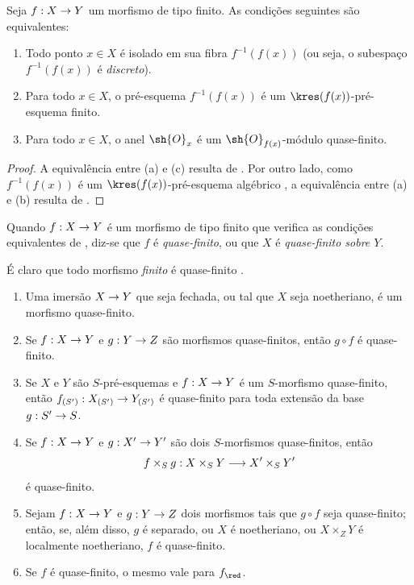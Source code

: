 \documentclass[oneside,10pt]{amsart}
\makeatletter
\newcommand{\ega@arrow}[2]{\mathchoice{#1}{#2}{#2}{#2}}
\renewcommand{\to}{\ega@arrow{\longrightarrow}{\rightarrow}}
\let\EGAOriginalLabel\label
\renewcommand{\label}[1]{\phantomsection\EGAOriginalLabel{#1}}
\makeatother
\begin{document}
\begin{corollary}[6.2.2]
\label{II.6.2.2}
Seja $f:X\to Y$ um morfismo de tipo finito.
As condições seguintes são equivalentes:
\begin{enumerate}
  \item[\rm{(a)}] Todo ponto $x\in X$ é isolado em sua fibra $f^{-1}(f(x))$ (ou seja, o subespaço $f^{-1}(f(x))$ é \emph{discreto}).
  \item[\rm{(b)}] Para todo $x\in X$, o pré-esquema $f^{-1}(f(x))$ é um $\kres(f(x))$-pré-esquema finito.
  \item[\rm{(c)}] Para todo $x\in X$, o anel $\sh{O}_x$ é um $\sh{O}_{f(x)}$-módulo quase-finito.
\end{enumerate}
\end{corollary}

\begin{proof}
A equivalência entre (a) e (c) resulta de .
Por outro lado, como $f^{-1}(f(x))$ é um $\kres(f(x))$-pré-esquema algébrico , a equivalência entre (a) e (b) resulta de .
\end{proof}

\begin{definition}[6.2.3]
\label{II.6.2.3}
Quando $f:X\to Y$ é um morfismo de tipo finito que verifica as condições equivalentes de , diz-se que $f$ é \emph{quase-finito}, ou que $X$ é \emph{quase-finito sobre $Y$}.
\end{definition}

É claro que todo morfismo \emph{finito} é quase-finito .

\begin{proposition}[6.2.4]
\label{II.6.2.4}
\medskip\noindent
\begin{enumerate}
  \item[\rm{(i)}] Uma imersão $X\to Y$ que seja fechada, ou tal que $X$ seja noetheriano, é um morfismo quase-finito.
  \item[\rm{(ii)}] Se $f:X\to Y$ e $g:Y\to Z$ são morfismos quase-finitos, então $g\circ f$ é quase-finito.
  \item[\rm{(iii)}] Se $X$ e $Y$ são $S$-pré-esquemas e $f:X\to Y$ é um $S$-morfismo quase-finito, então $f_{(S')}:X_{(S')}\to Y_{(S')}$ é quase-finito para toda extensão da base $g:S'\to S$.
  \item[\rm{(iv)}] Se $f:X\to Y$ e $g:X'\to Y'$ são dois $S$-morfismos quase-finitos, então
    \[
      f\times_S g:X\times_S Y\to X'\times_S Y'
    \]
    é quase-finito.
  \item[\rm{(v)}] Sejam $f:X\to Y$ e $g:Y\to Z$ dois morfismos tais que $g\circ f$ seja quase-finito; então, se, além disso, $g$ é separado, ou $X$ é noetheriano, ou $X\times_ZY$ é localmente noetheriano, $f$ é quase-finito.
  \item[\rm{(vi)}] Se $f$ é quase-finito, o mesmo vale para $f_\red$.
\end{enumerate}
\end{proposition}
\end{document}
